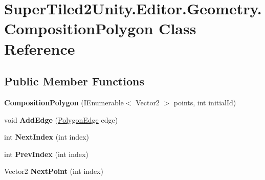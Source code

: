 \hypertarget{class_super_tiled2_unity_1_1_editor_1_1_geometry_1_1_composition_polygon}{}\section{Super\+Tiled2\+Unity.\+Editor.\+Geometry.\+Composition\+Polygon Class Reference}
\label{class_super_tiled2_unity_1_1_editor_1_1_geometry_1_1_composition_polygon}
\subsection*{Public Member Functions}
\begin{DoxyCompactItemize}
\item 
\mbox{\label{class_super_tiled2_unity_1_1_editor_1_1_geometry_1_1_composition_polygon_a5ceb785a30ad9611dd4c53dc74c83168}} 
{\bfseries Composition\+Polygon} (I\+Enumerable$<$ Vector2 $>$ points, int initial\+Id)
\item 
\mbox{\label{class_super_tiled2_unity_1_1_editor_1_1_geometry_1_1_composition_polygon_aa547889c0d2bb03968441c3f443f41cf}} 
void {\bfseries Add\+Edge} (\mbox{\hyperlink{class_super_tiled2_unity_1_1_editor_1_1_geometry_1_1_polygon_edge}{Polygon\+Edge}} edge)
\item 
\mbox{\label{class_super_tiled2_unity_1_1_editor_1_1_geometry_1_1_composition_polygon_aa5f19f92b4855ca000f2fbe7d8fc3d36}} 
int {\bfseries Next\+Index} (int index)
\item 
\mbox{\label{class_super_tiled2_unity_1_1_editor_1_1_geometry_1_1_composition_polygon_aeffa0dea76e7023ec6abcd4db2629ee1}} 
int {\bfseries Prev\+Index} (int index)
\item 
\mbox{\label{class_super_tiled2_unity_1_1_editor_1_1_geometry_1_1_composition_polygon_a5efef0188839400123a3c98e7867ef82}} 
Vector2 {\bfseries Next\+Point} (int index)

\end{DoxyCompactItemize}

